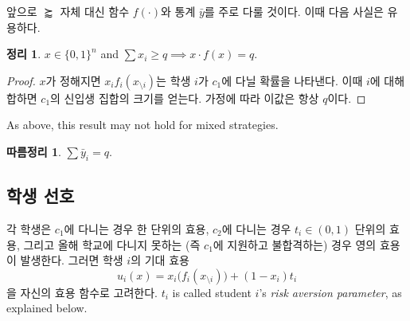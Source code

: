 \documentclass[12pt]{article} %
\newif\ifEN
\newtheorem{theorem}{Theorem}
\newtheorem{corollary}{Corollary}
\theoremstyle{definition}
\newtheorem{theorem}{정리}
\newtheorem{corollary}{따름정리}
\theoremstyle{definition}
\begin{document}
\ifEN{
Going forward, we will interact with $\succapprox$ primarily via the function $f(\cdot)$ and the statistic $\bar y$. The following fact is helpful.
\begin{theorem} \label{sumfiq}
$x \in \{0, 1\}^n$ and $\sum x_i \geq q \implies x \cdot f(x) = q$.
\end{theorem}
\begin{proof}
When $x$ is fixed, the quantity $x_i f_i(x_{\setminus i})$ represents the probability that student $i$ will attend $c_1$. Thus, summing over $i$ yields the expected size of $c_1$’s entering class. By assumption, this is always $q$.
\end{proof}
As above, this result may not hold for mixed strategies. 
\begin{corollary} \label{sumyiq}
$\sum \bar y_i = q$. 
\end{corollary}
} \else {
앞으로 $\succapprox$ 자체 대신 함수 $f(\cdot)$와 통계 $\bar y$를 주로 다룰 것이다. 이때 다음 사실은 유용하다.
\begin{theorem} \label{sumfiq}
$x \in \{0, 1\}^n$ and $\sum x_i \geq q \implies x \cdot f(x) = q$.
\end{theorem}
\begin{proof}
$x$가 정해지면 $x_i f_i(x_{\setminus i})$는 학생 $i$가 $c_1$에 다닐 확률을 나타낸다. 이때 $i$에 대해 합하면 $c_1$의 신입생 집합의 크기를 얻는다. 가정에 따라 이값은 항상 $q$이다.
\end{proof}
As above, this result may not hold for mixed strategies. 
\begin{corollary} \label{sumyiq}
$\sum \bar y_i = q$. 
\end{corollary}
} \fi

\ifEN{\subsection{Student preferences}} \else {\subsection{학생 선호}}\fi
\ifEN{Each student receives one unit of utility if she attends $c_1$, $t_i \in (0, 1)$ units of utility if she attends $c_2$, and zero units of utility if she is unable to enroll in college this season (that is, if she applies to $c_1$ and is rejected). We regard student $i$’s expected utility
\begin{equation}
u_i(x) = x_i\bigl( f_i(x_{\setminus i})\bigr) + (1 - x_i) t_i
\end{equation}
as her utility function. $t_i$ is called student $i$’s \emph{risk aversion parameter}, as explained below.
} \else {
각 학생은 $c_1$에 다니는 경우 한 단위의 효용, $c_2$에 다니는 경우 $t_i \in (0, 1)$ 단위의 효용, 그리고 올해 학교에 다니지 못하는 (즉 $c_1$에 지원하고 불합격하는) 경우 영의 효용이 발생한다. 그러면 학생 $i$의 기대 효용
\begin{equation}
u_i(x) = x_i\bigl( f_i(x_{\setminus i})\bigr) + (1 - x_i) t_i
\end{equation}
을 자신의 효용 함수로 고려한다. $t_i$ is called student $i$’s \emph{risk aversion parameter}, as explained below.
} \fi
\end{document}
